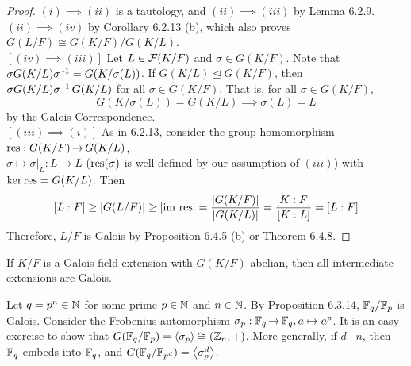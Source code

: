 \documentclass[11pt]{book}
\theoremstyle{definition}   \newtheorem{defn}[counter]{Definition} %
\newcommand{\nsg}{\mathrel{\unlhd}}   \newcommand{\ind}{\parindent24pt}   \newcommand{\vn}{\varnothing}    \newcommand{\lar}{\longrightarrow}
\newcommand{\gen}[1]{\left\langle #1 \right\rangle}   \newcommand{\stab}[2]{\tn{Stab}_{#1}(#2)}   \newcommand{\fix}[2]{\tn{Fix}_{#1}(#2)}   \newcommand{\op}{^{\tn{op}}}
\DeclareMathOperator{\ra}{\rightarrow}   \DeclareMathOperator{\Poly}{\mathbf{P}}   \DeclareMathOperator{\spn}{\textnormal{span}}   \DeclareMathOperator{\aut}{\textnormal{Aut}}
\newcommand{\vs}{\vspace{8pt}}   \newcommand{\hs}{\hspace{8pt}}
\numberwithin{counter}{chapter}
\begin{document}
\begin{proof}
$(i) \implies (ii)$ is a tautology, and $(ii) \implies (iii)$ by Lemma 6.2.9. $(ii) \implies (iv)$ by Corollary 6.2.13 (b), which also proves $G(L/F) \cong G(K/F) / G(K/L)$. \\

$[(iv) \implies (iii)]$ Let $L \in \mathcal{F}(K/F)$ and $\sigma \in G(K/F)$. Note that $\sigma G(K/L) \sigma\operatorname{^{-1}} = G(K/\sigma(L))$. If $G(K/L) \nsg G(K/F)$, then $\sigma G(K/L) \sigma\operatorname{^{-1}} G(K/L)$ for all $\sigma \in G(K/F)$. That is, for all $\sigma \in G(K/F)$, 
	\[G(K/\sigma(L)) = G(K/L) \implies \sigma(L) = L \]
by the Galois Correspondence.  \\

$[(iii) \implies (i)]$ As in 6.2.13, consider the group homomorphism $\tn{res} : G(K/F) \ra G(K/L)$, \\ $\sigma \mapsto \sigma|_L : L \ra L$ ($\textnormal{res}(\sigma)$ is well-defined by our assumption of $(iii)$) with $\ker \textnormal{res} = G(K/L)$. Then
\[[L : F] \geq |G(L/F)| \geq |\textnormal{im } \textnormal{res}| = \frac{|G(K/F)|}{|G(K/L)|} = \frac{[K : F]}{[K : L]} = [L : F] \]
Therefore, $L/F$ is Galois by Proposition 6.4.5 (b) or Theorem 6.4.8. 
\end{proof}

\vs

\begin{corollary}
If $K/F$ is a Galois field extension with $G(K/F)$ abelian, then all intermediate extensions are Galois. 
\end{corollary}

\vs

\begin{example}
Let $q = p^n \in \operatorname{\mathbb{N}}$ for some prime $p \in \operatorname{\mathbb{N}}$ and $n \in \operatorname{\mathbb{N}}$. By Proposition 6.3.14, $\mathbb{F}_q/\mathbb{F}_p$ is Galois. Consider the Frobenius automorphism $\sigma_p : \mbb{F}_q \ra \mbb{F}_q, a \mapsto a^p$. It is an easy exercise to show that $G(\mbb{F}_q/\mbb{F}_p) = \gen{\sigma_p} \cong (\z_n,+)$. More generally, if $d \mid n$, then $\mathbb{F}_q$ embeds into $\mathbb{F}_q$, and $G(\mbb{F}_q/\mbb{F}_{p^d}) = \gen{\sigma_p^d}$. 
\end{example}

\vs
\end{document}
